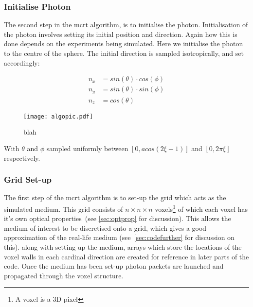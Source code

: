 \subsubsection{Initialise Photon}\label{sec:algoinit}

The second step in the \gls{mcrt} algorithm, is to initialise the photon. Initialisation of the photon involves setting its initial position and direction. Again how this is done depends on the experiments being simulated. Here we initialise the photon to the centre of the sphere. The initial direction is sampled isotropically, and set accordingly:

\begin{align}
n_{x}&=sin(\theta) \cdot cos(\phi)\\
n_{y}&=sin(\theta) \cdot sin(\phi)\\
n_{z}&=cos(\theta)
\end{align}

\begin{wrapfigure}{I}{\columnwidth/2}
\texttt{[image: algopic.pdf]}
\caption{blah}
\label{fig:algo}
\end{wrapfigure}


With $\theta$ and $\phi$ sampled uniformly between $[0,acos(2\xi-1)]$ and $[0,2\pi\xi]$ respectively.


\subsubsection{Grid Set-up}\label{sec:photsetup}

The first step of the \gls{mcrt} algorithm is to set-up the grid which acts as the simulated medium. This grid consists of $n \times n \times n$ voxels\footnote{A voxel is a 3D pixel} of which each voxel has it's own optical properties~(see \cref{sec:optprop} for discussion). This allows the medium of interest to be discretised onto a grid, which gives a good approximation of the real-life medium (see~\cref{sec:codefurther} for discussion on this). along with setting up the medium, arrays which store the locations of the voxel walls in each cardinal direction are created for reference in later parts of the code. Once the medium has been set-up photon packets are launched and propagated through the voxel structure.


